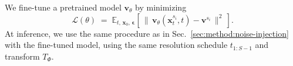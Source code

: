 We fine-tune a pretrained model $\mathbf{v}_\theta$ by minimizing
\begin{equation}
  \mathcal{L}(\theta) \;=\; \mathbb{E}_{t,\, \mathbf{x}_0,\, \boldsymbol{\epsilon}}\!\left[\,\|\,\mathbf{v}_\theta(\mathbf{x}_t^{s_i}, t) - \mathbf{v}^{s_i}\,\|^2\,\right].
  \label{eq:lora-loss}
\end{equation}
At inference, we use the same procedure as in Sec.~\ref{sec:method:noise-injection} with the fine-tuned model, using the same resolution schedule $t_{1:S-1}$ and transform $T_\Phi$.
